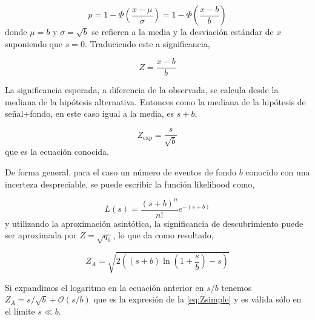 \begin{equation}
  p = 1 - \Phi \left( \frac{x-\mu}{\sigma} \right) = 1 - \Phi \left(
  \frac{x-b}{b} \right)
\end{equation}
%
donde $\mu=b$ y $\sigma = \sqrt{b}$ se refieren a la media y la desviación
estándar de $x$ suponiendo que $s=0$. Traduciendo este {\pvalue} a significancia,

\begin{equation}
  Z = \frac{x-b}{b}
\end{equation}

La significancia esperada, a diferencia de la observada, se calcula desde la mediana
de la hipótesis alternativa. Entonces como la mediana de la hipótesis de señal+fondo,
en este caso igual a la media, es $s+b$,

\begin{equation}
  Z_\text{exp} = \frac{s}{\sqrt{b}}
  \label{eq:Zsimple}
\end{equation}
%
que es la ecuación conocida. %

De forma general, para el caso un número de eventos de fondo $b$ conocido con
una incerteza despreciable, se puede escribir la función likelihood como,

\begin{equation}
  L(s) = \frac{(s+b)^n}{n!} e^{-(s+b)}
\end{equation}
%
y utilizando la aproximación asintótica, la significancia de descubrimiento
puede ser aproximada por $Z=\sqrt{q_0}$, lo que da como resultado,

%

\begin{equation}
  Z_A = \sqrt{2\left( (s+b) \ln \left( 1 + \frac{s}{b}\right) - s \right)}
  \label{eq:Z}
\end{equation}

Si expandimos el logaritmo en la ecuación anterior en $s/b$ tenemos $Z_A =
s/\sqrt{b} + \mathcal{O}(s/b)$ que es la expresión de la \cref{eq:Zsimple}
y es válida sólo en el límite $s \ll b$.


